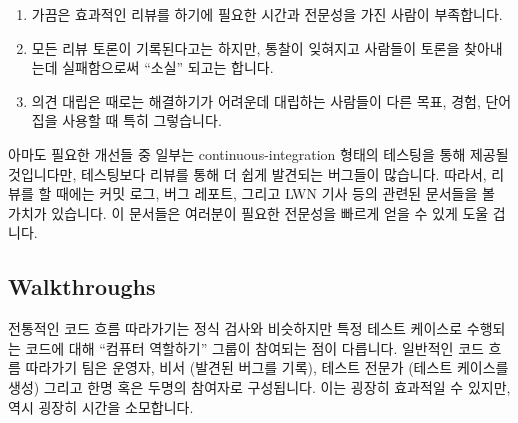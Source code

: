 \begin{enumerate}
\item	가끔은 효과적인 리뷰를 하기에 필요한 시간과 전문성을 가진 사람이
	부족합니다.
\item	모든 리뷰 토론이 기록된다고는 하지만, 통찰이 잊혀지고 사람들이 토론을
	찾아내는데 실패함으로써 ``소실'' 되고는 합니다.
\item	의견 대립은 때로는 해결하기가 어려운데 대립하는 사람들이 다른 목표,
	경험, 단어집을 사용할 때 특히 그렇습니다.

\end{enumerate}

아마도 필요한 개선들 중 일부는 continuous-integration 형태의 테스팅을 통해
제공될 것입니다만, 테스팅보다 리뷰를 통해 더 쉽게 발견되는 버그들이 많습니다.
따라서, 리뷰를 할 때에는 커밋 로그, 버그 레포트, 그리고 LWN 기사 등의 관련된
문서들을 볼 가치가 있습니다.
이 문서들은 여러분이 필요한 전문성을 빠르게 얻을 수 있게 도울 겁니다.

\subsection{Walkthroughs}
\label{sec:debugging:Walkthroughs}

전통적인 코드 흐름 따라가기는 정식 검사와 비슷하지만 특정 테스트 케이스로
수행되는 코드에 대해 ``컴퓨터 역할하기'' 그룹이 참여되는 점이 다릅니다.
일반적인 코드 흐름 따라가기 팀은 운영자, 비서 (발견된 버그를 기록), 테스트
전문가 (테스트 케이스를 생성) 그리고 한명 혹은 두명의 참여자로 구성됩니다.
이는 굉장히 효과적일 수 있지만, 역시 굉장히 시간을 소모합니다.

